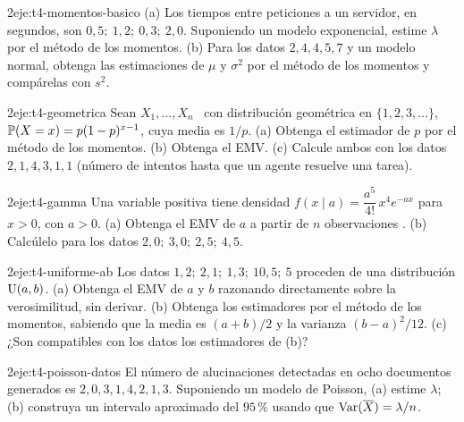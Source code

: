 \begin{ejercicio}{2}{eje:t4-momentos-basico}
(a) Los tiempos entre peticiones a un servidor, en segundos, son $0{,}5;\allowbreak\ 1{,}2;\allowbreak\ 0{,}3;\allowbreak\ 2{,}0$. Suponiendo un modelo exponencial, estime $\lambda$ por el método de los momentos. (b) Para los datos $2,4,4,5,7$ y un modelo normal, obtenga las estimaciones de $\mu$ y $\sigma^{2}$ por el método de los momentos y compárelas con $s^{2}$.
\end{ejercicio}

\begin{ejercicio}{2}{eje:t4-geometrica}
Sean $X_1,\dots,X_n$ \iid\ con distribución geométrica en $\{1,2,3,\dots\}$, $\mathbb{P}(X=x)=p(1-p)^{x-1}$, cuya media es $1/p$. (a) Obtenga el estimador de $p$ por el método de los momentos. (b) Obtenga el EMV. (c) Calcule ambos con los datos $2,1,4,3,1,1$ (número de intentos hasta que un agente resuelve una tarea).
\end{ejercicio}

\begin{ejercicio}{2}{eje:t4-gamma}
Una variable positiva tiene densidad $f(x\mid a)=\dfrac{a^{5}}{4!}\,x^{4}e^{-ax}$ para $x>0$, con $a>0$. (a) Obtenga el EMV de $a$ a partir de $n$ observaciones \iid. (b) Calcúlelo para los datos $2{,}0;\allowbreak\ 3{,}0;\allowbreak\ 2{,}5;\allowbreak\ 4{,}5$.
\end{ejercicio}

\begin{ejercicio}{2}{eje:t4-uniforme-ab}
Los datos $1{,}2;\allowbreak\ 2{,}1;\allowbreak\ 1{,}3;\allowbreak\ 10{,}5;\allowbreak\ 5$ proceden de una distribución $\operatorname{U}(a,b)$. (a) Obtenga el EMV de $a$ y $b$ razonando directamente sobre la verosimilitud, sin derivar. (b) Obtenga los estimadores por el método de los momentos, sabiendo que la media es $(a+b)/2$ y la varianza $(b-a)^{2}/12$. (c) ¿Son compatibles con los datos los estimadores de (b)?
\end{ejercicio}

\begin{ejercicio}{2}{eje:t4-poisson-datos}
El número de alucinaciones detectadas en ocho documentos generados es $2,0,3,1,4,2,1,3$. Suponiendo un modelo de Poisson, (a) estime $\lambda$; (b) construya un intervalo aproximado del $95\,\%$ usando que $\operatorname{Var}(\overline{X})=\lambda/n$.
\end{ejercicio}

